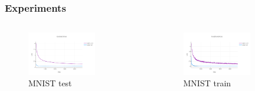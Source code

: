 \documentclass[
	11pt, %
]{beamer}
\begin{document}

\begin{frame}
  \frametitle{Experiments}


      \begin{columns}[c]
    \begin{column}{.5\textwidth}
    \begin{figure}
        \centering
        \includegraphics[width=0.7\textwidth]{../report/images/MNIST_test.png}
        \caption{MNIST test}
    \end{figure}      
    \end{column}
    \begin{column}{.5\textwidth}
    \begin{figure}
        \centering
        \includegraphics[width=0.7\textwidth]{../report/images/MNIST_train.png}
        \caption{MNIST train}
    \end{figure}
    \end{column}
  \end{columns}


\end{frame}
\end{document}
